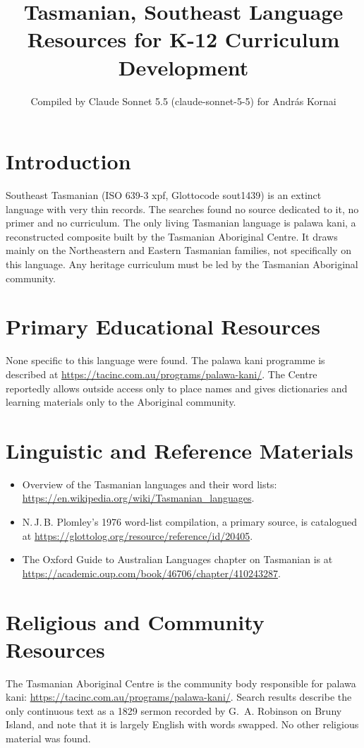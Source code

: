 \documentclass[12pt]{article}
\title{Tasmanian, Southeast Language Resources for K-12 Curriculum Development}
\author{Compiled by Claude Sonnet 5.5 (claude-sonnet-5-5) for Andr\'as Kornai}
\date{}
\begin{document}
\maketitle

\section{Introduction}
Southeast Tasmanian (ISO 639-3 xpf, Glottocode sout1439) is an extinct language with very thin records. The searches found no source dedicated to it, no primer and no curriculum. The only living Tasmanian language is palawa kani, a reconstructed composite built by the Tasmanian Aboriginal Centre. It draws mainly on the Northeastern and Eastern Tasmanian families, not specifically on this language. Any heritage curriculum must be led by the Tasmanian Aboriginal community.

\section{Primary Educational Resources}
None specific to this language were found. The palawa kani programme is described at \url{https://tacinc.com.au/programs/palawa-kani/}. The Centre reportedly allows outside access only to place names and gives dictionaries and learning materials only to the Aboriginal community.

\section{Linguistic and Reference Materials}
\begin{itemize}
\item Overview of the Tasmanian languages and their word lists: \url{https://en.wikipedia.org/wiki/Tasmanian_languages}.
\item N.\,J.\,B. Plomley's 1976 word-list compilation, a primary source, is catalogued at \url{https://glottolog.org/resource/reference/id/20405}.
\item The Oxford Guide to Australian Languages chapter on Tasmanian is at \url{https://academic.oup.com/book/46706/chapter/410243287}.
\end{itemize}

\section{Religious and Community Resources}
The Tasmanian Aboriginal Centre is the community body responsible for palawa kani: \url{https://tacinc.com.au/programs/palawa-kani/}. Search results describe the only continuous text as a 1829 sermon recorded by G.~A. Robinson on Bruny Island, and note that it is largely English with words swapped. No other religious material was found.
\end{document}
